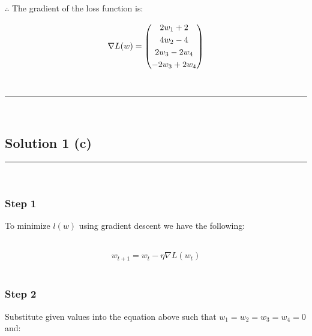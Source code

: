 \documentclass{article}
\begin{document}
\subsubsection*{\normalfont}{$\therefore$ The gradient of the loss function is:}

$$\nabla L(w) = \begin{pmatrix} 
2w_1 + 2 \vspace{0.1cm}\\
4w_2 - 4 \vspace{0.1cm}\\
2w_3 - 2w_4 \vspace{0.1cm}\\
-2w_3 + 2w_4
\end{pmatrix}$$\\

\noindent\rule{\textwidth}{0.4pt}\\

\newpage

\subsection*{Solution 1 (c)}
\noindent\rule{\textwidth}{0.4pt}\\

\subsubsection*{Step 1}
\parbox{\textwidth}{
To minimize $l(w)$ using gradient descent we have the following:
}\\

$$w_{t+1} = w_t - \eta \nabla L(w_t)$$\\

\subsubsection*{Step 2}
\parbox{\textwidth}{
Substitute given values into the equation above such that $w_1 = w_2 = w_3 = w_4 = 0$ and:
}\\
\end{document}
